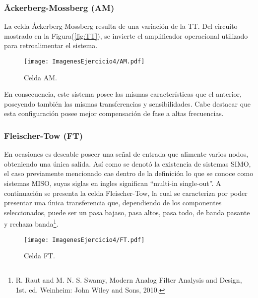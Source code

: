 \subsubsection{\r{A}ckerberg-Mossberg (AM)}
La celda \r{A}ckerberg-Mossberg resulta de una variación de la TT. Del circuito mostrado en la Figura(\ref{fig:TT}), se invierte el amplificador operacional utilizado para retroalimentar el sistema.
\begin{figure}[H]
\centering
	\texttt{[image: ImagenesEjercicio4/AM.pdf]}
	\caption{Celda AM.}
	\label{fig:AM}
\end{figure}

En consecuencia, este sistema posee las mismas características que el anterior, poseyendo también las mismas transferencias y sensibilidades. Cabe destacar que esta configuración posee mejor compensación de fase a altas frecuencias.

\subsubsection{Fleischer-Tow (FT)}
En ocasiones es deseable poseer una señal de entrada que alimente varios nodos, obteniendo una única salida. Así como se denotó la existencia de sistemas SIMO, el caso previamente mencionado cae dentro de la definición lo que se conoce como sistemas MISO, suyas siglas en ingles significan ``multi-in single-out''. A continuación se presenta la celda Fleischer-Tow, la cual se caracteriza por poder presentar una única transferencia que, dependiendo de los componentes seleccionados, puede ser un pasa bajaso, pasa altos, pasa todo, de banda pasante y rechaza banda\footnote{R. Raut and M. N. S. Swamy, Modern Analog Filter Analysis and Design, 1st. ed. Weinheim: John Wiley and Sons, 2010.}.
\begin{figure}[H]
\centering
	\texttt{[image: ImagenesEjercicio4/FT.pdf]}
	\caption{Celda FT.}
	\label{fig:FT}
\end{figure}

